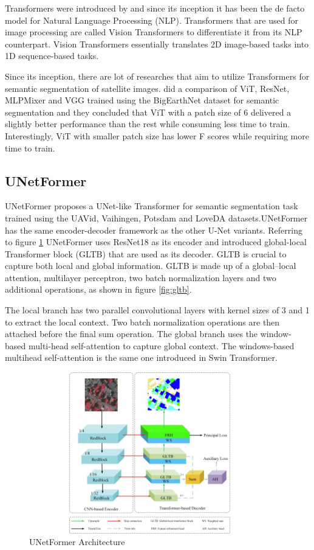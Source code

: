 Transformers were introduced by \cite{attention-is-all-you-need} and since its inception it has been the de facto model for Natural Language Processing (NLP). Transformers that are used for image processing are called Vision Transformers to differentiate it from its NLP counterpart. Vision Transformers essentially translates 2D image-based tasks into 1D sequence-based tasks.

Since its inception, there are lot of researches that aim to utilize Transformers for semantic segmentation of satellite images. 
\cite{benchmarking-scaling} did a comparison of ViT, ResNet, MLPMixer and VGG trained using the BigEarthNet dataset for semantic segmentation and they concluded that ViT with a patch size of 6 delivered a slightly better performance than the rest while consuming less time to train. Interestingly, ViT with smaller patch size has lower F scores while requiring more time to train.
\subsection{UNetFormer}
UNetFormer \cite{unetformer} proposes a UNet-like Transformer for semantic segmentation task trained using the UAVid, Vaihingen, Potsdam and LoveDA datasets.UNetFormer has the same encoder-decoder framework as the other U-Net variants. Referring to figure \ref{fig:unetformer} UNetFormer uses ResNet18 as its encoder and introduced global-local Transformer block (GLTB) that are used as its decoder. GLTB is crucial to capture both local and global information. GLTB is made up of a global–local attention, multilayer perceptron, two batch normalization layers and two additional operations, as shown in figure \ref{fig:gltb}.

The local branch has two parallel convolutional layers with kernel sizes of 3 and 1 to extract the local context. Two batch normalization operations are then attached before the final sum operation. The global branch uses the window-based multi-head self-attention to capture global context. The windows-based multihead self-attention is the same one introduced in Swin Transformer.

\FloatBarrier
\begin{figure}[ht]
\includegraphics[width=10.5cm, height=7cm]{images/unetformer.jpg}
\centering
\caption{UNetFormer Architecture}
\label{fig:unetformer}
\end{figure}

